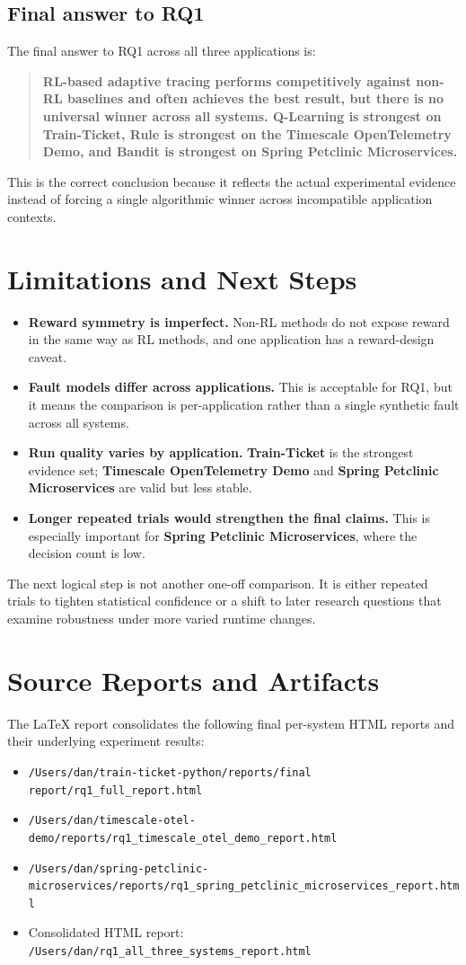 \documentclass[11pt]{report}
\newcommand{\TT}{\textbf{Train-Ticket}}
\newcommand{\TS}{\textbf{Timescale OpenTelemetry Demo}}
\newcommand{\SP}{\textbf{Spring Petclinic Microservices}}
\begin{document}
\section{Final answer to RQ1}
The final answer to RQ1 across all three applications is:

\begin{quote}
\textbf{RL-based adaptive tracing performs competitively against non-RL baselines and often achieves the best result, but there is no universal winner across all systems. Q-Learning is strongest on Train-Ticket, Rule is strongest on the Timescale OpenTelemetry Demo, and Bandit is strongest on Spring Petclinic Microservices.}
\end{quote}

This is the correct conclusion because it reflects the actual experimental evidence instead of forcing a single algorithmic winner across incompatible application contexts.

\chapter{Limitations and Next Steps}
\begin{itemize}
    \item \textbf{Reward symmetry is imperfect.} Non-RL methods do not expose reward in the same way as RL methods, and one application has a reward-design caveat.
    \item \textbf{Fault models differ across applications.} This is acceptable for RQ1, but it means the comparison is per-application rather than a single synthetic fault across all systems.
    \item \textbf{Run quality varies by application.} \TT{} is the strongest evidence set; \TS{} and \SP{} are valid but less stable.
    \item \textbf{Longer repeated trials would strengthen the final claims.} This is especially important for \SP{}, where the decision count is low.
\end{itemize}
The next logical step is not another one-off comparison. It is either repeated trials to tighten statistical confidence or a shift to later research questions that examine robustness under more varied runtime changes.

\appendix
\chapter{Source Reports and Artifacts}
The LaTeX report consolidates the following final per-system HTML reports and their underlying experiment results:
\begin{itemize}
    \item \texttt{/Users/dan/train-ticket-python/reports/final report/rq1\_full\_report.html}
    \item \texttt{/Users/dan/timescale-otel-demo/reports/rq1\_timescale\_otel\_demo\_report.html}
    \item \texttt{/Users/dan/spring-petclinic-microservices/reports/rq1\_spring\_petclinic\_microservices\_report.html}
    \item Consolidated HTML report: \texttt{/Users/dan/rq1\_all\_three\_systems\_report.html}
\end{itemize}
\end{document}
